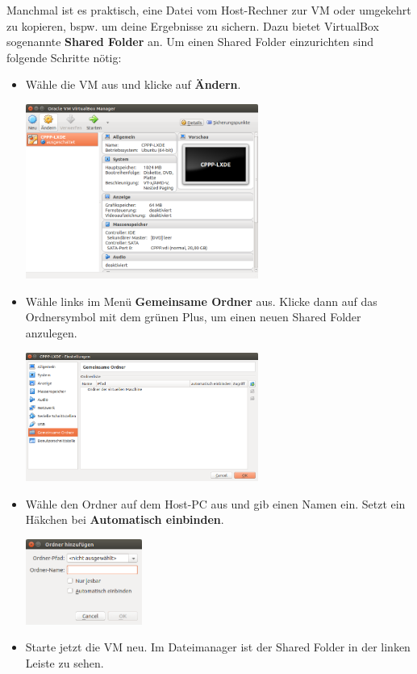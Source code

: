 Manchmal ist es praktisch, eine Datei vom Host-Rechner zur VM oder umgekehrt zu kopieren, bspw. um deine Ergebnisse zu sichern.
Dazu bietet VirtualBox sogenannte \textbf{Shared Folder} an.
Um einen Shared Folder einzurichten sind folgende Schritte nötig:

\begin{itemize}
\item Wähle die VM aus und klicke auf \textbf{Ändern}.
\begin{center}
	\includegraphics[width=0.6\textwidth]{07_cheatsheet/figures/sf1.png}
\end{center}
\item Wähle links im Menü \textbf{Gemeinsame Ordner} aus. Klicke dann auf das Ordnersymbol mit dem grünen Plus, um einen neuen Shared Folder anzulegen.
\begin{center}
	\includegraphics[width=0.6\textwidth]{07_cheatsheet/figures/sf2.png}
\end{center}
\item Wähle den Ordner auf dem Host-PC aus und gib einen Namen ein.
Setzt ein Häkchen bei \textbf{Automatisch einbinden}.
\begin{center}
	\includegraphics[width=0.3\textwidth]{07_cheatsheet/figures/sf3.png}
\end{center}
\item Starte jetzt die VM neu. Im Dateimanager ist der Shared Folder in der linken Leiste zu sehen.
\end{itemize}
